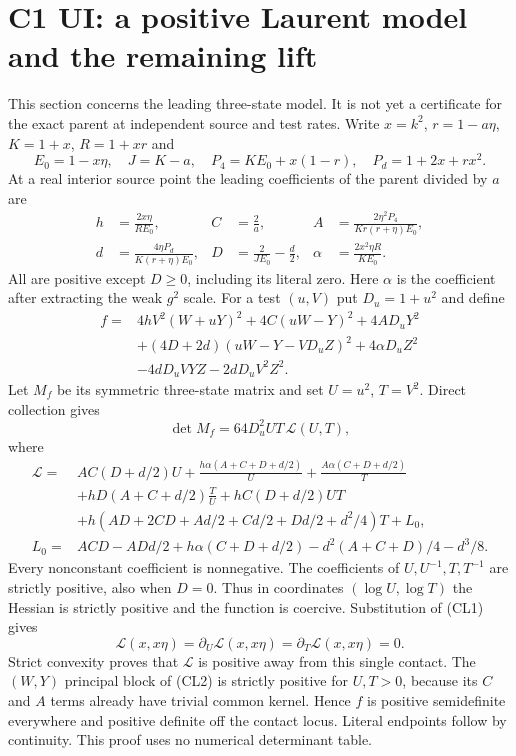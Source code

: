 \section{C1 UI: a positive Laurent model and the remaining lift}
\label{sec:c1-ui-leading}
This section concerns the leading three-state model. It is not yet a
certificate for the exact parent at independent source and test rates.
Write $x=k^2$, $r=1-a\eta$, $K=1+x$, $R=1+xr$ and
\[
 E_0=1-x\eta,\quad J=K-a,\quad
 P_4=KE_0+x(1-r),\quad P_d=1+2x+rx^2.
\]
At a real interior source point the leading coefficients of the
parent divided by $a$ are
\[
\begin{aligned}
 h&=\frac{2x\eta}{RE_0},& C&=\frac2a,&
 A&=\frac{2\eta^2P_4}{Kr(r+\eta)E_0},\\
 d&=\frac{4\eta P_d}{K(r+\eta)E_0},&
 D&=\frac2{JE_0}-\frac d2,&
 \alpha&=\frac{2x^2\eta R}{KE_0}.
\end{aligned}                                                     \tag{CL1}
\]
All are positive except $D\ge0$, including its literal zero. Here
$\alpha$ is the coefficient after extracting the weak $g^2$ scale.
For a test $(u,V)$ put $D_u=1+u^2$ and define
\begin{align*}
f={}&4hV^2(W+uY)^2+4C(uW-Y)^2+4AD_uY^2\\
 &+(4D+2d)(uW-Y-VD_uZ)^2+4\alpha D_uZ^2\\
 &-4dD_uVYZ-2dD_uV^2Z^2.                           \tag{CL2}
\end{align*}
Let $M_f$ be its symmetric three-state matrix and set $U=u^2$, $T=V^2$.
Direct collection gives
\[
 \det M_f=64D_u^2UT\,\mathcal L(U,T),                 \tag{CL3}
\]
where
\begin{align*}
\mathcal L={}&AC(D+d/2)U+
 \frac{h\alpha(A+C+D+d/2)}U+\frac{A\alpha(C+D+d/2)}T\\
 &+hD(A+C+d/2)\frac TU+hC(D+d/2)UT\\
 &+h(AD+2CD+Ad/2+Cd/2+Dd/2+d^2/4)T+L_0,\\
L_0={}&ACD-ADd/2+h\alpha(C+D+d/2)
                         -d^2(A+C+D)/4-d^3/8.       \tag{CL4}
\end{align*}
Every nonconstant coefficient is nonnegative. The coefficients of
$U,U^{-1},T,T^{-1}$ are strictly positive, also when $D=0$.
Thus in coordinates $(\log U,\log T)$ the Hessian is strictly
positive and the function is coercive. Substitution of (CL1) gives
\[
 \mathcal L(x,x\eta)=\partial_U\mathcal L(x,x\eta)
                   =\partial_T\mathcal L(x,x\eta)=0. \tag{CL5}
\]
Strict convexity proves that $\mathcal L$ is positive away from this
single contact. The $(W,Y)$ principal block of (CL2) is strictly
positive for $U,T>0$, because its $C$ and $A$ terms already have
trivial common kernel. Hence $f$ is positive semidefinite everywhere
and positive definite off the contact locus. Literal endpoints follow
by continuity. This proof uses no numerical determinant table.

